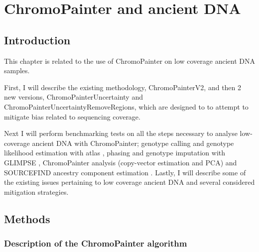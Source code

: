 \chapter{ChromoPainter and ancient DNA}
\label{chapterlabel2}

\section{Introduction}

This chapter is related to the use of ChromoPainter on low coverage ancient DNA samples. 

First, I will describe the existing methodology, ChromoPainterV2, and then 2 new versions, ChromoPainterUncertainty and ChromoPainterUncertaintyRemoveRegions, which are designed to to attempt to mitigate bias related to sequencing coverage. 

Next I will perform benchmarking tests on all the steps necessary to analyse low-coverage ancient DNA with ChromoPainter; genotype calling and genotype likelihood estimation with atlas \cite{Link2017}, phasing and genotype imputation with GLIMPSE \cite{rubinacci2021efficient}, ChromoPainter \cite{Lawson2012} analysis (copy-vector estimation and PCA) and SOURCEFIND ancestry component estimation \cite{Chacon-Duque2018}. Lastly, I will describe some of the existing issues pertaining to low coverage ancient DNA and several considered mitigation strategies. 

\section{Methods}

\subsection{Description of the ChromoPainter algorithm}

